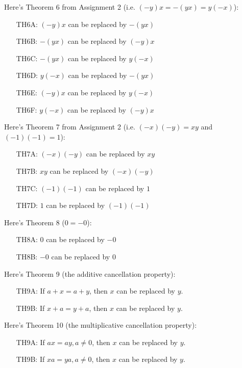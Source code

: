 \documentclass[a4paper,12pt]{article}
\begin{document}
Here's Theorem 6 from Assignment 2 (i.e. $(-y)x = -(yx) = y(-x)$):
\begin{enumerate}[leftmargin=\LISTMARGIN]
\item[TH6A:] $(-y)x$ can be replaced by $-(yx)$
\item[TH6B:] $-(yx)$ can be replaced by $(-y)x$
\item[TH6C:] $-(yx)$ can be replaced by $y(-x)$
\item[TH6D:] $y(-x)$ can be replaced by $-(yx)$
\item[TH6E:] $(-y)x$ can be replaced by $y(-x)$
\item[TH6F:] $y(-x)$ can be replaced by $(-y)x$ 
\end{enumerate}

Here's Theorem 7 from Assignment 2 (i.e. $(-x)(-y) = xy$ and $(-1)(-1)=1$):
\begin{enumerate}[leftmargin=\LISTMARGIN]
\item[TH7A:] $(-x)(-y)$ can be replaced by $xy$
\item[TH7B:] $xy$ can be replaced by $(-x)(-y)$
\item[TH7C:] $(-1)(-1)$ can be replaced by $1$
\item[TH7D:] $1$ can be replaced by $(-1)(-1)$
\end{enumerate}

Here's Theorem 8 ($0 = -0$):
\begin{enumerate}[leftmargin=\LISTMARGIN]
\item[TH8A:] $0$ can be replaced by $-0$
\item[TH8B:] $-0$ can be replaced by $0$
\end{enumerate}

Here's Theorem 9 (the additive cancellation property):
\begin{enumerate}[leftmargin=\LISTMARGIN]
\item[TH9A:] If $a + x = a + y$, then $x$ can be replaced by $y$.
\item[TH9B:] If $x + a = y + a$, then $x$ can be replaced by $y$.
\end{enumerate}

Here's Theorem 10 (the multiplicative cancellation property):
\begin{enumerate}[leftmargin=\LISTMARGIN]
\item[TH9A:] If $ax = ay, a \neq 0$, then $x$ can be replaced by $y$.
\item[TH9B:] If $xa = ya, a \neq 0$, then $x$ can be replaced by $y$.
\end{enumerate}
\end{document}
